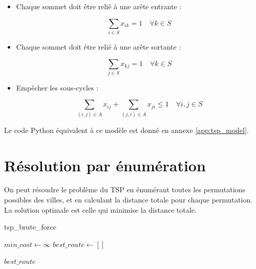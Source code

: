 \begin{itemize}
    \item Chaque sommet doit être relié à une arête entrante :
    
    \begin{equation}
        \sum_{i \in S} x_{ik} = 1 \quad \forall k \in S
    \end{equation}
        

    \item Chaque sommet doit être relié à une arête sortante :
    
    \begin{equation}
        \sum_{j \in S} x_{kj} = 1 \quad \forall k \in S
    \end{equation}

    \item Empêcher les sous-cycles :
    
    \begin{equation}
        \sum_{(i,j) \in A} x_{ij} + \sum_{(j,i) \in A} x_{ji} \leq 1 \quad \forall i,j \in S
    \end{equation}
\end{itemize}

Le code Python équivalent à ce modèle est donné en annexe \ref{app:tsp_model}.

\section*{Résolution par énumération}

On peut résoudre le problème du TSP en énumérant toutes les permutations possibles des villes, et en calculant la distance totale pour chaque permutation. La solution optimale est celle qui minimise la distance totale.

\begin{algorithm}[H]
    \caption{tsp\_brute\_force}\label{alg:tsp_enum}

    $min\_cost \gets \infty$\;
    $best\_route \gets []$\;

    \Return $best\_route$\;

\end{algorithm}

